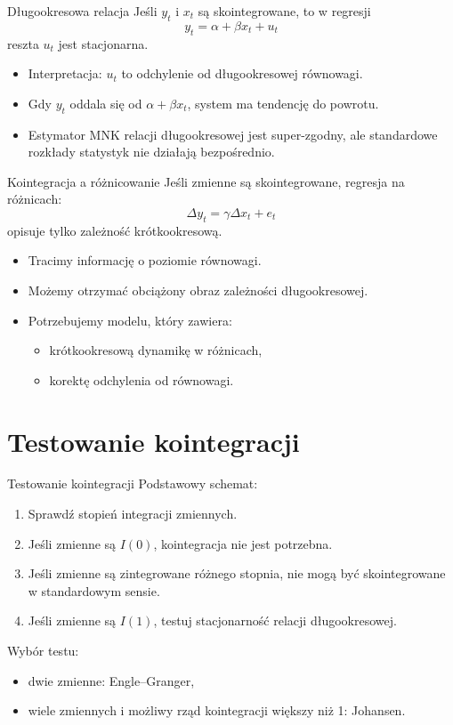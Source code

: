 \documentclass[11pt,aspectratio=169,xcolor=dvipsnames]{beamer}
\begin{document}
\begin{frame}{Długookresowa relacja}
  Jeśli $y_t$ i $x_t$ są skointegrowane, to w regresji
  \[
    y_t = \alpha + \beta x_t + u_t
  \]
  reszta $u_t$ jest stacjonarna.

  \begin{itemize}
    \item Interpretacja: $u_t$ to odchylenie od długookresowej równowagi.
    \item Gdy $y_t$ oddala się od $\alpha+\beta x_t$, system ma tendencję do powrotu.
    \item Estymator MNK relacji długookresowej jest super-zgodny, ale standardowe rozkłady statystyk nie działają bezpośrednio.
  \end{itemize}
\end{frame}

\begin{frame}{Kointegracja a różnicowanie}
  Jeśli zmienne są skointegrowane, regresja na różnicach:
  \[
    \Delta y_t = \gamma \Delta x_t + e_t
  \]
  opisuje tylko zależność krótkookresową.

  \begin{itemize}
    \item Tracimy informację o poziomie równowagi.
    \item Możemy otrzymać obciążony obraz zależności długookresowej.
    \item Potrzebujemy modelu, który zawiera:
      \begin{itemize}
        \item krótkookresową dynamikę w różnicach,
        \item korektę odchylenia od równowagi.
      \end{itemize}
  \end{itemize}
\end{frame}

\section{Testowanie kointegracji}

\begin{frame}{Testowanie kointegracji}
  Podstawowy schemat:
  \begin{enumerate}
    \item Sprawdź stopień integracji zmiennych.
    \item Jeśli zmienne są $I(0)$, kointegracja nie jest potrzebna.
    \item Jeśli zmienne są zintegrowane różnego stopnia, nie mogą być skointegrowane w standardowym sensie.
    \item Jeśli zmienne są $I(1)$, testuj stacjonarność relacji długookresowej.
  \end{enumerate}

  \vspace{0.3cm}
  Wybór testu:
  \begin{itemize}
    \item dwie zmienne: Engle--Granger,
    \item wiele zmiennych i możliwy rząd kointegracji większy niż 1: Johansen.
  \end{itemize}
\end{frame}
\end{document}

